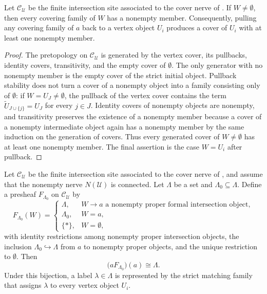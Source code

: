 \begin{lemma}\label{lem:formal-site-nonempty-refinements}
Let \(\mathcal C_{\mathcal U}\) be the finite intersection site associated to the cover nerve of
. If \(W\ne\emptyset\), then
every covering family of \(W\) has a nonempty member. Consequently,
pulling any covering family of \(a\) back to a vertex object \(U_i\)
produces a cover of \(U_i\) with at least one nonempty member.
\end{lemma}

\begin{proof}
The pretopology on \(\mathcal C_{\mathcal U}\) is generated by the vertex
cover, its pullbacks, identity covers, transitivity, and the empty cover of
\(\emptyset\). The only generator with no nonempty member is the empty
cover of the strict initial object. Pullback stability does not turn a
cover of a nonempty object into a family consisting only of
\(\emptyset\): if \(W=U_J\ne\emptyset\), the pullback of the vertex cover
contains the term \(\widetilde U_{J\cup\{j\}}=U_J\) for every \(j\in J\).
Identity covers of nonempty objects are nonempty, and transitivity
preserves the existence of a nonempty member because a cover of a
nonempty intermediate object again has a nonempty member by the same
induction on the generation of covers. Thus every generated cover of
\(W\ne\emptyset\) has at least one nonempty member. The final assertion is
the case \(W=U_i\) after pullback.
\end{proof}

\begin{lemma}\label{lem:formal-label-sheafification}
Let \(\mathcal C_{\mathcal U}\) be the finite intersection site associated to the cover nerve of
, and assume that the
nonempty nerve \(N(\mathcal U)\) is connected. Let \(\Lambda\) be a set and
\(\Lambda_0\subseteq\Lambda\). Define a presheaf \(F_{\Lambda_0}\) on
\(\mathcal C_{\mathcal U}\) by
\[
F_{\Lambda_0}(W)=
\begin{cases}
\Lambda,& W\to a\text{ a nonempty proper formal intersection object},\\
\Lambda_0,& W=a,\\
\{\ast\},& W=\emptyset,
\end{cases}
\]
with identity restrictions among nonempty proper intersection objects,
the inclusion \(\Lambda_0\hookrightarrow\Lambda\) from \(a\) to nonempty
proper objects, and the unique restriction to \(\emptyset\). Then
\[
\bigl(aF_{\Lambda_0}\bigr)(a)\cong\Lambda.
\]
Under this bijection, a label \(\lambda\in\Lambda\) is represented by the
strict matching family that assigns \(\lambda\) to every vertex object
\(U_i\).
\end{lemma}

